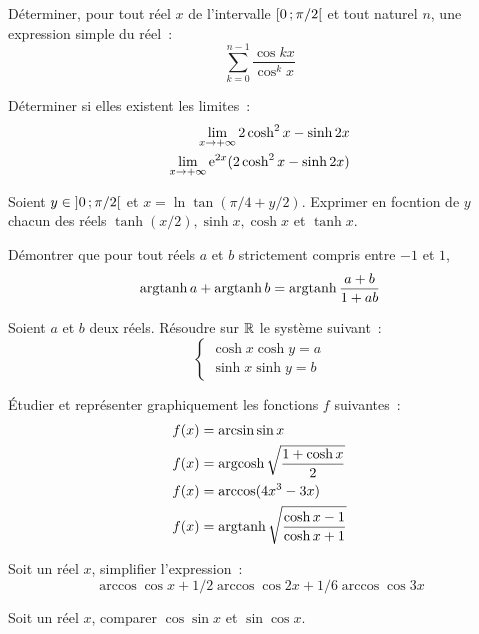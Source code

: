 \begin{exercice}
    Déterminer, pour tout réel \(x\) de l'intervalle \(\left[ 0 \, ;  \pi/2 \right[\) et tout naturel \(n\), une expression simple du réel~:
    \begin{equation}
        \sum_{k=0}^{n-1} \frac{\cos kx}{\cos^k x}
    \end{equation}
\end{exercice}
\begin{exercice}
    Déterminer si elles existent les limites~:
    \begin{align}
        \lim\limits_{x \to +\infty} 2\cosh^2x-\sinh 2x \\
        \lim\limits_{x \to +\infty} \operatorname{e}^{2x}(2\cosh^2x-\sinh 2x)
    \end{align}
\end{exercice}
\begin{exercice}
    Soient \(y \in \left] 0 \, ;  \pi/2 \right[\) et \(x = \ln\tan(\pi/4+y/2)\). Exprimer en focntion de \(y\) chacun des réels \(\tanh(x/2), \sinh x, \cosh x\) et \(\tanh x\).
\end{exercice}
\begin{exercice}
    Démontrer que pour tout réels \(a\) et \(b\) strictement compris entre \(-1\) et \(1\),
    \begin{equation}
        \operatorname{argtanh} a + \operatorname{argtanh} b = \operatorname{argtanh} \frac{a+b}{1+ab}
    \end{equation}
\end{exercice}
\begin{exercice}
    Soient \(a\) et \(b\) deux réels. Résoudre sur \(\mathbb{R}\) le système suivant~:
    \begin{equation}
        \begin{cases} \cosh x \cosh y = a \\ \sinh x \sinh y = b \end{cases}
    \end{equation}
\end{exercice}
\begin{exercice}
    Étudier et représenter graphiquement les fonctions \(f\) suivantes~:
    \begin{align}
        f(x) &= \arcsin \sin x \\
        f(x) &= \operatorname{argcosh} \sqrt{\frac{1+\cosh x}{2}} \\
        f(x) &= \arccos(4x^3-3x) \\
        f(x) &= \operatorname{argtanh}\sqrt{\frac{\cosh x - 1}{\cosh x + 1}}
    \end{align}
\end{exercice}
\begin{exercice}
    Soit un réel \(x\), simplifier l'expression~:
    \begin{equation}
        \arccos \cos x + 1/2 \arccos\cos 2x + 1/6\arccos\cos 3x
    \end{equation}
\end{exercice}
\begin{exercice}
    Soit un réel \(x\), comparer \(\cos\sin x\) et \(\sin\cos x\).
\end{exercice}
